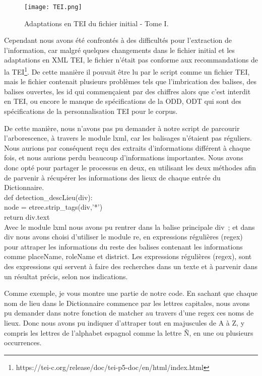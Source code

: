 \documentclass[a4paper,12pt,twoside]{book}
\begin{document}
\begin{figure}[!h]
    \centering
    \texttt{[image: TEI.png]}
    \caption{Adaptations en TEI du fichier initial - Tome I.}
    \label{quatFig}
\end{figure}


Cependant nous avons été confrontés à des difficultés pour l’extraction de l’information, car malgré quelques changements dans le fichier initial et les adaptations en XML TEI, le fichier n’était pas conforme aux recommandations de la TEI\footnote{https://tei-c.org/release/doc/tei-p5-doc/en/html/index.html}. De cette manière il pouvait être lu par le script comme un fichier \Gls{TEI}, mais le fichier contenait plusieurs problèmes tels que l’imbrication des balises, des balises ouvertes, les id qui commençaient par des chiffres alors que c’est interdit en TEI, ou encore le manque de spécifications de la ODD, ODT qui sont des spécifications de la personnalisation TEI pour le corpus.

De cette manière, nous n’avons pas pu demander à notre script de parcourir l’arborescence, à travers le module lxml, car les balisages n’étaient pas réguliers. Nous aurions par conséquent reçu des extraits d’informations différent à chaque fois, et nous aurions perdu beaucoup d’informations importantes. Nous avons donc opté pour partager le processus en deux, en utilisant les deux méthodes afin de parvenir à récupérer les informations des lieux de chaque entrée du Dictionnaire. \\

def detection\_descLieu(div):\\
  node = etree.strip\_tags(div,'*')\\
  return div.text\\

Avec le module lxml nous avons pu rentrer dans la balise principale div ; et dans div nous avons choisi d’utiliser le module re, en expressions régulières (regex) pour attraper les informations du reste des balises contenant les informations comme placeName, roleName et district. Les expressions régulières (regex), sont des expressions qui servent à faire des recherches dans un texte et à parvenir dans un résultat précis, selon nos indications. 

Comme exemple, je vous montre une partie de notre code. En sachant que chaque nom de lieu dans le Dictionnaire commence par les lettres capitales, nous avons pu demander dans notre fonction de matcher au travers d’une regex ces noms de lieux. Donc nous avons pu indiquer d’attraper tout en majuscules de A à Z, y compris les lettres de l’alphabet espagnol comme la lettre Ñ, en une ou plusieurs occurrences.\\
\end{document}

